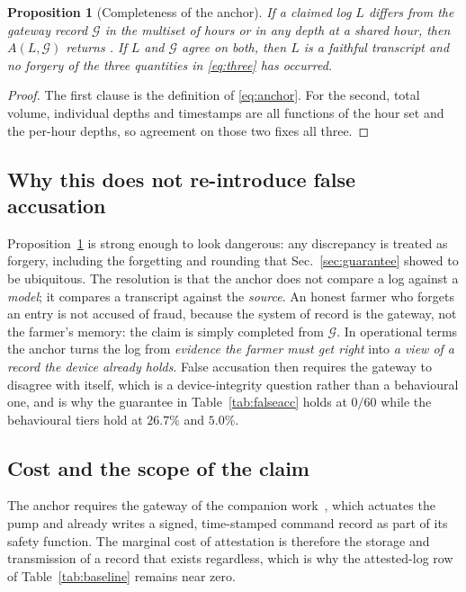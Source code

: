 \documentclass[journal]{IEEEtran}
\newtheorem{proposition}{Proposition}
\begin{document}
\begin{proposition}[Completeness of the anchor]
\label{prop:complete}
If a claimed log $L$ differs from the gateway record $\mathcal{G}$ in the
multiset of hours or in any depth at a shared hour, then $A(L,\mathcal{G})$
returns . If $L$ and $\mathcal{G}$ agree on both, then $L$ is a
faithful transcript and no forgery of the three quantities in \eqref{eq:three}
has occurred.
\end{proposition}

\begin{proof}
The first clause is the definition of \eqref{eq:anchor}. For the second, total
volume, individual depths and timestamps are all functions of the hour set and
the per-hour depths, so agreement on those two fixes all three.
\end{proof}

\subsection{Why this does not re-introduce false accusation}

Proposition~\ref{prop:complete} is strong enough to look dangerous: any
discrepancy is treated as forgery, including the forgetting and rounding that
Sec.~\ref{sec:guarantee} showed to be ubiquitous. The resolution is that the
anchor does not compare a log against a \emph{model}; it compares a transcript
against the \emph{source}. An honest farmer who forgets an entry is not accused
of fraud, because the system of record is the gateway, not the farmer's memory:
the claim is simply completed from $\mathcal{G}$. In operational terms the anchor
turns the log from \emph{evidence the farmer must get right} into \emph{a view of
a record the device already holds}. False accusation then requires the gateway to
disagree with itself, which is a device-integrity question rather than a
behavioural one, and is why the guarantee in Table~\ref{tab:falseacc} holds at
$0/60$ while the behavioural tiers hold at $26.7\%$ and $5.0\%$.

\subsection{Cost and the scope of the claim}

The anchor requires the gateway of the companion work~\cite{twingate2026}, which
actuates the pump and already writes a signed, time-stamped command record as
part of its safety function. The marginal cost of attestation is therefore the
storage and transmission of a record that exists regardless, which is why the
attested-log row of Table~\ref{tab:baseline} remains near zero.
\end{document}
